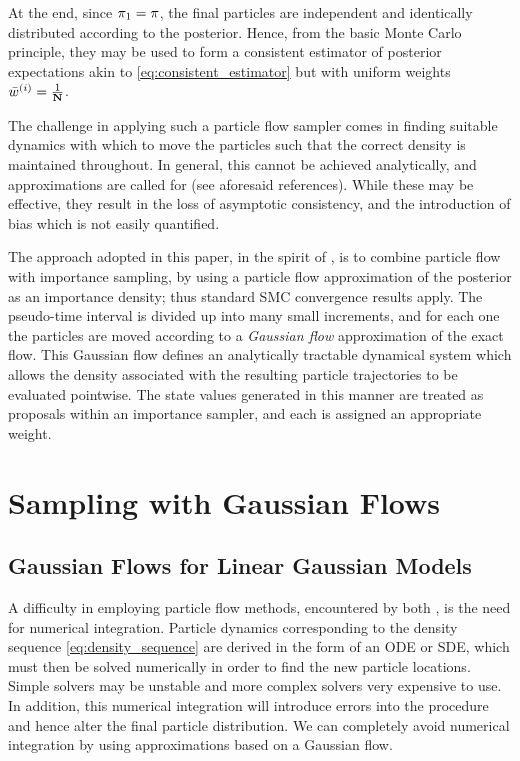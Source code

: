 \documentclass{article}
\begin{document}
At the end, since $\pi_{1} = \pi$, the final particles are independent and identically distributed according to the posterior. Hence, from the basic Monte Carlo principle, they may be used to form a consistent estimator of posterior expectations akin to \eqref{eq:consistent_estimator} but with uniform weights $\bar{w}_{}^{(i)}=\frac{1}{\mathbf{N}}$.

The challenge in applying such a particle flow sampler comes in finding suitable dynamics with which to move the particles such that the correct density is maintained throughout. In general, this cannot be achieved analytically, and approximations are called for (see aforesaid references). While these may be effective, they result in the loss of asymptotic consistency, and the introduction of bias which is not easily quantified.

The approach adopted in this paper, in the spirit of \cite{Reich2012}, is to combine particle flow with importance sampling, by using a particle flow approximation of the posterior as an importance density; thus standard SMC convergence results apply. The pseudo-time interval is divided up into many small increments, and for each one the particles are moved according to a \emph{Gaussian flow} approximation of the exact flow. This Gaussian flow defines an analytically tractable dynamical system which allows the density associated with the resulting particle trajectories to be evaluated pointwise. The state values generated in this manner are treated as proposals within an importance sampler, and each is assigned an appropriate weight.



\section{Sampling with Gaussian Flows}

\subsection{Gaussian Flows for Linear Gaussian Models}

A difficulty in employing particle flow methods, encountered by both \cite{Daum2011d,Reich2011}, is the need for numerical integration. Particle dynamics corresponding to the density sequence \eqref{eq:density_sequence} are derived in the form of an ODE or SDE, which must then be solved numerically in order to find the new particle locations. Simple solvers may be unstable and more complex solvers very expensive to use. In addition, this numerical integration will introduce errors into the procedure and hence alter the final particle distribution. We can completely avoid numerical integration by using approximations based on a Gaussian flow.
\end{document}

